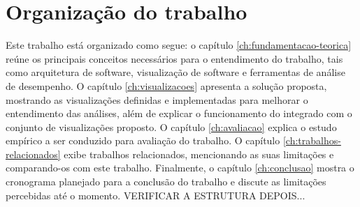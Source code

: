 \section{Organização do trabalho} \label{sec:organizacao-trabalho}

Este trabalho está organizado como segue: o capítulo \ref{ch:fundamentacao-teorica} reúne os principais conceitos necessários para o entendimento do trabalho, tais como arquitetura de software, visualização de software e ferramentas de análise de desempenho. O capítulo \ref{ch:visualizacoes} apresenta a solução proposta, mostrando as visualizações definidas e implementadas para melhorar o entendimento das análises, além de explicar o funcionamento do \textit{\perfMinerName} integrado com o conjunto de visualizações proposto. O capítulo \ref{ch:avaliacao} explica o estudo empírico a ser conduzido para avaliação do trabalho. O capítulo \ref{ch:trabalhos-relacionados} exibe trabalhos relacionados, mencionando as suas limitações e comparando-os com este trabalho. Finalmente, o capítulo \ref{ch:conclusao} mostra o cronograma planejado para a conclusão do trabalho e discute as limitações percebidas até o momento. {\color{red} VERIFICAR A ESTRUTURA DEPOIS...}